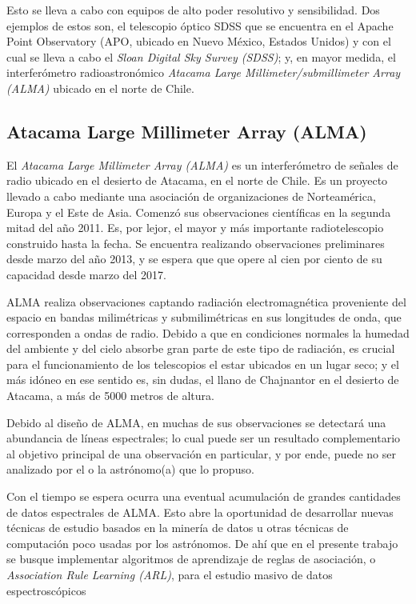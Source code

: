 Esto se lleva a cabo con equipos de alto poder resolutivo y sensibilidad. Dos ejemplos de estos son, el telescopio óptico SDSS que se encuentra en el Apache Point Observatory (APO, ubicado en Nuevo México, Estados Unidos) y con el cual se lleva a cabo el \textit{Sloan Digital Sky Survey (SDSS)}; y, en mayor medida, el interferómetro radioastronómico \textit{Atacama Large Millimeter/submillimeter Array (ALMA)} ubicado en el norte de Chile.

\subsection{Atacama Large Millimeter Array (ALMA)}

El \textit{Atacama Large Millimeter Array (ALMA)} es un interferómetro de señales de radio ubicado en el desierto de Atacama, en el norte de Chile. Es un proyecto llevado a cabo mediante una asociación de organizaciones de Norteamérica, Europa y el Este de Asia. Comenzó sus observaciones científicas en la segunda mitad del año 2011. Es, por lejor, el mayor y más importante radiotelescopio construido hasta la fecha. Se encuentra realizando observaciones preliminares desde marzo del año 2013, y se espera que que opere al cien por ciento de su capacidad desde marzo del 2017.

ALMA realiza observaciones captando radiación electromagnética proveniente del espacio en bandas milimétricas y submilimétricas en sus longitudes de onda, que corresponden a ondas de radio. Debido a que en condiciones normales la humedad del ambiente y del cielo absorbe gran parte de este tipo de radiación, es crucial para el funcionamiento de los telescopios el estar ubicados en un lugar seco; y el más idóneo en ese sentido es, sin dudas, el llano de Chajnantor en el desierto de Atacama, a más de 5000 metros de altura.

Debido al diseño de ALMA, en muchas de sus observaciones se detectará una abundancia de líneas espectrales; lo cual puede ser un resultado complementario al objetivo principal de una observación en particular, y por ende, puede no ser analizado por el o la astrónomo(a) que lo propuso.

Con el tiempo se espera ocurra una eventual acumulación de grandes cantidades de datos espectrales de ALMA. Esto abre la oportunidad de desarrollar nuevas técnicas de estudio basados en la minería de datos u otras técnicas de computación poco usadas por los astrónomos. De ahí que en el presente trabajo se busque implementar algoritmos de aprendizaje de reglas de asociación, o \textit{Association Rule Learning (ARL)}, para el estudio masivo de datos espectroscópicos

